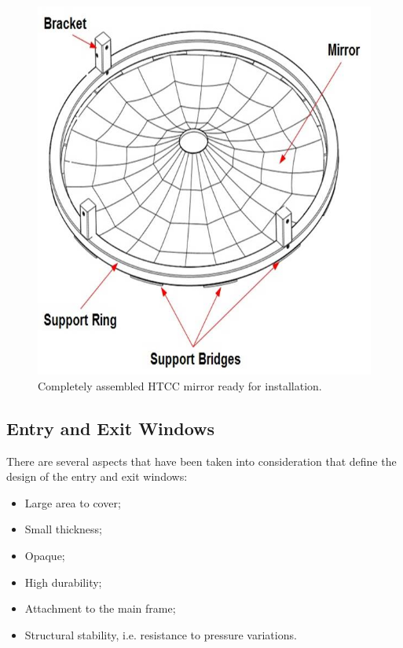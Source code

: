 \begin{figure}[ht]
    \centering
        \includegraphics[width=1.0\linewidth]{images/Support_Ring_2.jpg}
    \caption{Completely assembled HTCC mirror ready for installation.}
    \label{fig:Ring_to_Mirror}
\end{figure}
 
\subsection {Entry and Exit Windows}

There are several aspects that have been taken into consideration that define the design of the entry and
exit windows:

\begin{itemize}
    \item Large area to cover;
    \item Small thickness;
    \item Opaque;
    \item High durability;
    \item Attachment to the main frame;
    \item Structural stability, i.e. resistance to pressure variations.
    \end{itemize}

